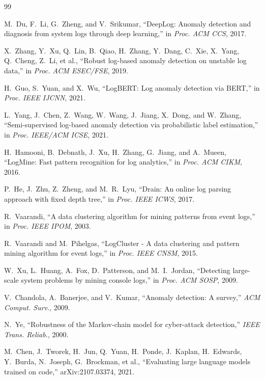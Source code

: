 \documentclass[11pt]{article}
\begin{document}

\begin{thebibliography}{99}

M.~Du, F.~Li, G.~Zheng, and V.~Srikumar,
``DeepLog: Anomaly detection and diagnosis from system logs through deep learning,''
in \emph{Proc. ACM CCS}, 2017.

X.~Zhang, Y.~Xu, Q.~Lin, B.~Qiao, H.~Zhang, Y.~Dang, C.~Xie, X.~Yang, Q.~Cheng, Z.~Li, et al.,
``Robust log-based anomaly detection on unstable log data,''
in \emph{Proc. ACM ESEC/FSE}, 2019.

H.~Guo, S.~Yuan, and X.~Wu,
``LogBERT: Log anomaly detection via BERT,''
in \emph{Proc. IEEE IJCNN}, 2021.

L.~Yang, J.~Chen, Z.~Wang, W.~Wang, J.~Jiang, X.~Dong, and W.~Zhang,
``Semi-supervised log-based anomaly detection via probabilistic label estimation,''
in \emph{Proc. IEEE/ACM ICSE}, 2021.

H.~Hamooni, B.~Debnath, J.~Xu, H.~Zhang, G.~Jiang, and A.~Mueen,
``LogMine: Fast pattern recognition for log analytics,''
in \emph{Proc. ACM CIKM}, 2016.

P.~He, J.~Zhu, Z.~Zheng, and M.~R.~Lyu,
``Drain: An online log parsing approach with fixed depth tree,''
in \emph{Proc. IEEE ICWS}, 2017.

R.~Vaarandi,
``A data clustering algorithm for mining patterns from event logs,''
in \emph{Proc. IEEE IPOM}, 2003.

R.~Vaarandi and M.~Pihelgas,
``LogCluster - A data clustering and pattern mining algorithm for event logs,''
in \emph{Proc. IEEE CNSM}, 2015.

W.~Xu, L.~Huang, A.~Fox, D.~Patterson, and M.~I.~Jordan,
``Detecting large-scale system problems by mining console logs,''
in \emph{Proc. ACM SOSP}, 2009.

V.~Chandola, A.~Banerjee, and V.~Kumar,
``Anomaly detection: A survey,''
\emph{ACM Comput. Surv.}, 2009.

N.~Ye,
``Robustness of the Markov-chain model for cyber-attack detection,''
\emph{IEEE Trans. Reliab.}, 2000.

M.~Chen, J.~Tworek, H.~Jun, Q.~Yuan, H.~Ponde, J.~Kaplan, H.~Edwards, Y.~Burda, N.~Joseph, G.~Brockman, et al.,
``Evaluating large language models trained on code,''
arXiv:2107.03374, 2021.


\end{thebibliography}
\end{document}
